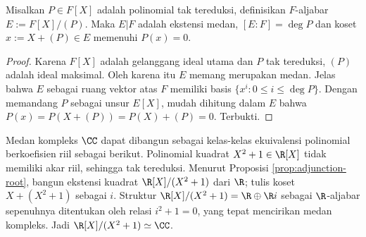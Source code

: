 \begin{proposition}[L.\ Kronecker]\label{prop:adjunction-root}
	Misalkan $P \in F[X]$ adalah polinomial tak tereduksi, definisikan $F$-aljabar $E := F[X]/(P)$. Maka $E|F$ adalah ekstensi medan, $[E:F] = \deg P$ dan koset $x := X + (P) \in E$ memenuhi $P(x)=0$.
\end{proposition}
\begin{proof}
	Karena $F[X]$ adalah gelanggang ideal utama dan $P$ tak tereduksi, $(P)$ adalah ideal maksimal. Oleh karena itu $E$ memang merupakan medan. Jelas bahwa $E$ sebagai ruang vektor atas $F$ memiliki basis $\{ x^i : 0 \leq i \leq \deg P \}$. Dengan memandang $P$ sebagai unsur $E[X]$, mudah dihitung dalam $E$ bahwa $P(x) = P(X + (P)) = P(X) + (P) = 0$. Terbukti.
\end{proof}

\begin{example}[A.\ L.\ Cauchy, 1847]\label{eg:Cauchy-C}
	Medan kompleks $\CC$ dapat dibangun sebagai kelas-kelas ekuivalensi polinomial berkoefisien riil sebagai berikut. Polinomial kuadrat $X^2+1 \in \R[X]$ tidak memiliki akar riil, sehingga tak tereduksi. Menurut Proposisi \ref{prop:adjunction-root}, bangun ekstensi kuadrat $\R[X]/(X^2+1)$ dari $\R$; tulis koset $X + (X^2+1)$ sebagai $i$. Struktur $\R[X]/(X^2+1) = \R \oplus \R i$ sebagai $\R$-aljabar sepenuhnya ditentukan oleh relasi $i^2 + 1=0$, yang tepat mencirikan medan kompleks. Jadi $\R[X]/(X^2+1) \simeq \CC$.
\end{example}


